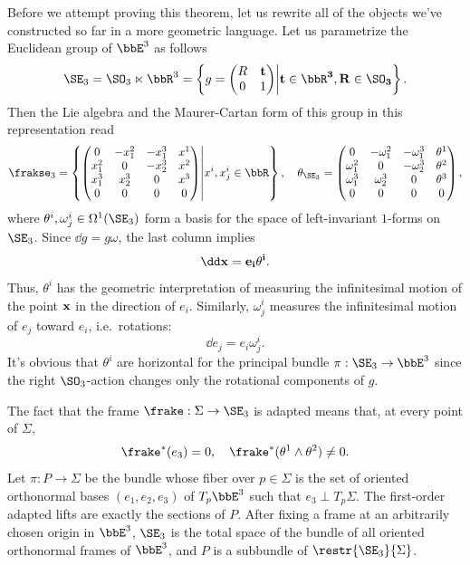 Before we attempt proving this theorem, let us rewrite all of the objects we've constructed so far in a more geometric language.
Let us parametrize the Euclidean group of $\bbE^3$ as follows 
\[\SE_3=\SO_3\ltimes\bbR^3=\left\{g=\begin{pmatrix}
    R & \bf{t}\\
    0 & 1
\end{pmatrix}\middle| \bf{t}\in\bbR^3,R\in\SO_3
\right\}.\]
Then the Lie algebra and the Maurer-Cartan form of this group in this representation read
\[ \frakse_3=\left\{\begin{pmatrix}
    0 & -x_1^2 & -x_1^3& x^1\\
    x_1^2 & 0 & -x_2^3 & x^2\\
    x_1^3 & x_2^3 & 0 & x^3\\
    0 & 0& 0& 0
\end{pmatrix}\middle| x^i,x^i_j\in\bbR\right\},
\quad
\theta_{\SE_3}=
    \begin{pmatrix}
        0 & -\omega_1^2 & -\omega_1^3& \theta^1\\
        \omega_1^2 & 0 & -\omega_2^3 & \theta^2\\
        \omega_1^3 & \omega_2^3 & 0 & \theta^3\\
        0 & 0& 0& 0
    \end{pmatrix},
\]
where $\theta^i,\omega^i_j\in\Omega^1(\SE_3)$ form a basis for the space of left-invariant $1$-forms on $\SE_3$. Since $\dd g=g\omega$, the last column implies 
\[\dd \bf{x}=e_i\theta^i.\]
Thus, $\theta^i$ has the geometric interpretation of measuring the infinitesimal motion of the point $\bf{x}$ in the direction of $e_i$. Similarly, $\omega^i_j$ measures the infinitesimal motion of $e_j$ toward $e_i$, i.e.\ rotations:
\[\dd e_j=e_i\omega^i_j.\]
It's obvious that $\theta^i$ are horizontal for the principal bundle $\pi:\SE_3\to\bbE^3$ since the right $\SO_3$-action changes only the rotational components of $g$.

The fact that the frame $\frake:\Sigma\to \SE_3$ is adapted means that, at every point of $\Sigma$,
\[\frake^\ast(e_3)=0,\quad \frake^\ast(\theta^1\wedge\theta^2)\neq 0.\label{eq 2.2 Ivey}\]
Let $\pi:P\to \Sigma$ be the bundle whose fiber over $p\in\Sigma$ is the set of oriented orthonormal bases $(e_1,e_2,e_3)$ of $T_p \bbE^3$ such that $e_3\perp T_p\Sigma$. The first-order adapted lifts are exactly the sections of $P$. After fixing a frame at an arbitrarily chosen origin in $\bbE^3$, $\SE_3$ is the total space of the bundle of all oriented orthonormal frames of $\bbE^3$, and $P$ is a subbundle of $\restr{\SE_3}{\Sigma}$.


